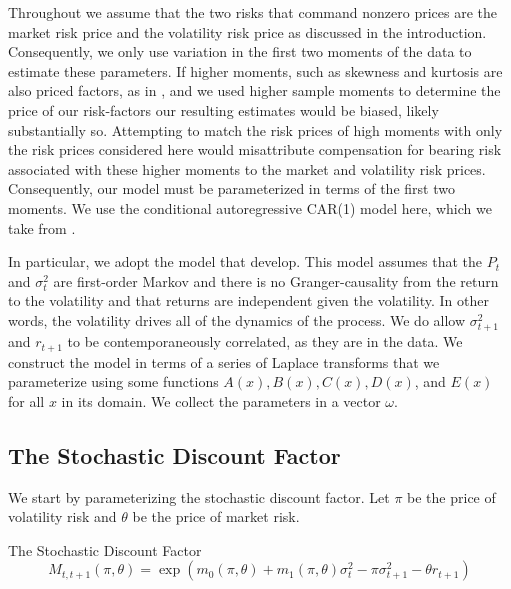 \documentclass[11pt, letterpaper, twoside]{article}
\begin{document}
Throughout we assume that the two risks that command nonzero prices are the market risk price and the volatility risk price as discussed in the introduction. Consequently, we only use variation in the first two moments of the data to estimate these parameters. If higher moments, such as skewness and kurtosis are also priced factors, as in \textcites{harvey2000conditional, conrad2012exante, chang2013market}, and we used higher sample moments to determine the price of our risk-factors our resulting estimates would be biased, likely substantially so. Attempting to match the risk prices of high moments with only the risk prices considered here would misattribute compensation for bearing risk associated with these higher moments to the market and volatility risk prices. Consequently, our model must be parameterized in terms of the first two moments. We use the conditional autoregressive CAR(1) model here, which we take from \textcite{darolles2006structural,han2018leverage}. 

In particular, we adopt the model that \textcite{han2018leverage} develop. This model assumes that the $P_t$ and $\sigma^2_t$ are first-order Markov and there is no Granger-causality from the return to the volatility and that returns are independent given the volatility. In other words, the volatility drives all of the dynamics of the process. We do allow $\sigma^2_{t+1}$ and $r_{t+1}$ to be contemporaneously correlated, as they are in the data. We construct the model in terms of a series of Laplace transforms that we parameterize using some functions $A(x), B(x), C(x), D(x)$, and $E(x)$ for all $x$ in its domain. We collect the parameters in a vector $\omega$.

\subsection{The Stochastic Discount Factor}\label{sec:deriving_sdf_functions}

We start by parameterizing the stochastic discount factor. Let $\pi$ be the price of volatility risk and $\theta$ be the price of market risk.

\begin{defn}{The Stochastic Discount Factor}
 \label{defn:SDF}
 \begin{equation}
 M_{t,t+1}(\pi, \theta) = \exp\left(m_{0}(\pi, \theta) + m_1(\pi, \theta) \sigma_t^2 - \pi \sigma^2_{t+1} -
 \theta r_{t+1}\right) 
 \end{equation}
\end{defn}
\end{document}
